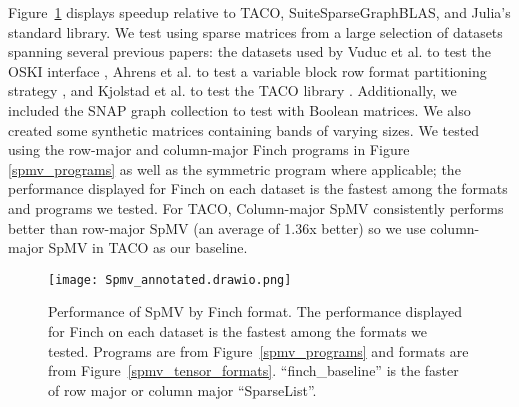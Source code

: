   Figure~\ref{fig:spmv_grouped} displays speedup relative to TACO, SuiteSparseGraphBLAS, and Julia’s standard library.  We test using sparse matrices from a large selection of datasets spanning several previous papers: the datasets used by Vuduc et al. to test the OSKI interface \cite{vuduc2005oski}, Ahrens et al. to test a variable block row format partitioning strategy \cite{ahrens_optimal_2021}, and Kjolstad et al. to test the TACO library \cite{kjolstad_tensor_2017}. Additionally, we included the SNAP graph collection to test with Boolean matrices. We also created some synthetic matrices containing bands of varying sizes.
  We tested using the row-major and column-major Finch programs in Figure \ref{spmv_programs} as well as the symmetric program where applicable; the performance displayed for Finch on each dataset is the fastest among the formats and programs we tested. For TACO, Column-major SpMV consistently performs better than row-major SpMV (an average of 1.36x better) so we use column-major SpMV in TACO as our baseline.
   
  \begin{figure}[!h]
    \texttt{[image: Spmv\_annotated.drawio.png]}
    \caption{\footnotesize Performance of SpMV by Finch format. The performance displayed for Finch on each dataset is the fastest among the formats we tested. Programs are from Figure~\ref{spmv_programs} and formats are from Figure~\ref{spmv_tensor_formats}. ``finch\_baseline'' is the faster of row major or column major ``SparseList''.}
    \label{fig:spmv_grouped}
  \end{figure} 

